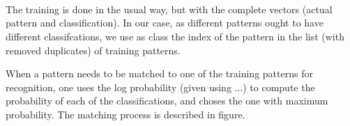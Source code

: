 \documentclass{letter}
\begin{document}
\ \ \ \ \ \ \ \ \ \ \ \ \ \ \ \ \ \ \ \ \ \ \ \ \ \ \ \ \ \ \ \ \ \ \ \ \ \
\ \ \  \ \ \ \ \ \ \ \ \
\ \ \ \ \ \ \ \ \ \ \ \ \ \ \ \ \ \ \ \ \ \ \ \ \ \ \ \ \ \ \ \

\ \ \ \ \ \ \ \ \ \ \ \ \ \ \ \ \ \ \ \ \ \ \ \ \ \ \ \ \ \ \ \ \ \ \ \ \ \

The training is done in the usual way, but with the complete vectors (actual
pattern and classification). In our case, as different patterns ought to have
different classifcations, we use as class the index of the pattern in the list
(with removed duplicates) of training patterns.

When a pattern needs to be matched to one of the training patterns for
recognition, one uses the log probability (given using ...) to compute the
probability of each of the classifications, and choses the one with maximum
probability. The matching process is described in figure.



\ \ 
\end{document}
